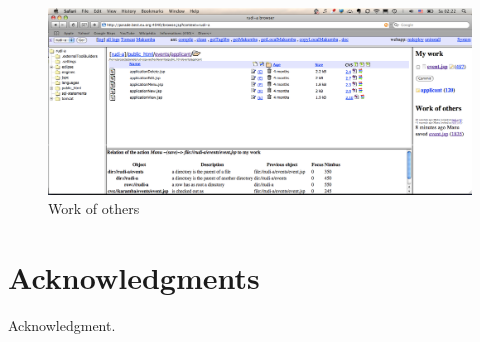 \documentclass{ecscw2007}
\begin{document}
\begin{figure}[thb]
  \centering
  \includegraphics[width=.98\linewidth]{work-others-cropped}
  \caption{Work of others}
  \label{fig:work-others-cropped}
\end{figure}



\section*{Acknowledgments} 

{\footnotesize Acknowledgment. }




  
\end{document}
